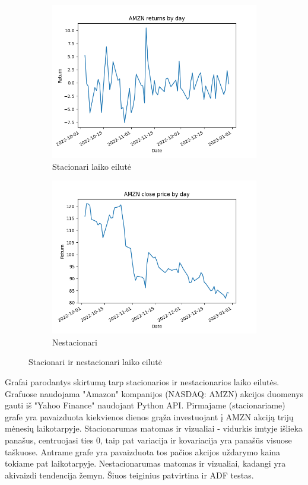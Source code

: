 \documentclass{VUMIFInfKursinis}
\begin{document}
\begin{figure}[H]
  \centering
  \begin{subfigure}{.5\textwidth}
    \centering
    \includegraphics[width=.6\linewidth]{img/AMZN_daily_return.png}
    \caption{Stacionari laiko eilutė}
    \label{fig:sub1}
  \end{subfigure}%
  \begin{subfigure}{.5\textwidth}
    \centering
    \includegraphics[width=.6\linewidth]{img/AMZN_daily_close.png}
    \caption{Nestacionari}
    \label{fig:sub2}
  \end{subfigure}
  \caption{Stacionari ir nestacionari laiko eilutė}
  \label{fig:test}
\end{figure}

Grafai parodantys skirtumą tarp stacionarios ir nestacionarios laiko eilutės. Grafuose naudojama "Amazon" kompanijos (NASDAQ: AMZN) akcijos duomenys gauti iš "Yahoo Finance" 
naudojant Python API\cite{yfinance}. Pirmajame (stacionariame) grafe yra pavaizduota kiekvienos dienos grąža investuojant į AMZN akciją trijų mėnesių laikotarpyje. 
Stacionarumas matomas ir vizualiai - vidurkis imtyje išlieka panašus, centruojasi ties 0, taip pat
variacija ir kovariacija yra panašūs visuose taškuose. Antrame grafe yra pavaizduota tos pačios akcijos uždarymo kaina tokiame pat laikotarpyje. 
Nestacionarumas matomas ir vizualiai, kadangi yra akivaizdi tendencija žemyn. Šiuos teiginius patvirtina ir ADF testas. %
\end{document}
